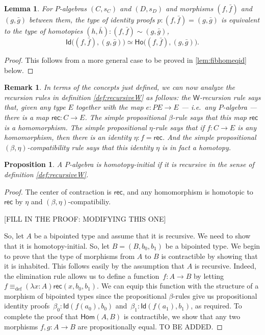 \documentclass[10pt,a4paper,oneside,reqno]{amsart}
\numberwithin{equation}{section}
\theoremstyle{mythm}
\newtheorem{lemma}[theorem]{Lemma}
\newtheorem{proposition}[theorem]{Proposition}
\theoremstyle{mydef}
\theoremstyle{myrmk}
\newtheorem{remark}[theorem]{Remark}
\newcommand{\deq}{\equiv}
\newcommand{\defeq}{\deq_{\mathrm{def}}}
\newcommand{\co}{\colon}
\newcommand{\Id}{\mathsf{Id}}
\newcommand{\W}{\mathsf{W}}
\newcommand{\rec}{\mathsf{rec}}
\newcommand{\Hom}{\mathsf{Hom}}
\newcommand{\Ho}{\mathsf{Ho}}
\begin{document}
\begin{lemma}\label{IdEqHo}
For $P$-algebras $(C,s_C)$ and $(D,s_D)$ and morphisms $(f, \bar{f})$ and $(g, \bar{g})$ between them, the type of identity proofs $p : (f, \bar{f}) = (g, \bar{g})$ is equivalent to the type of homotopies $(h, \bar{h}) : (f, \bar{f}) \sim (g, \bar{g})$,
\[
\Id\big((f, \bar{f}), (g, \bar{g})\big) \simeq \Ho\big((f, \bar{f}), (g, \bar{g})\big).
\]
\end{lemma}

\begin{proof}
This follows from a more general case to be proved in \ref{lem:fibhomeqid} below.
\end{proof}

\begin{remark}\label{rem:explainrules}
In terms of the concepts just defined, we can now analyze the recursion rules in definition \ref{def:recursiveW} as follows: the $\W$-recursion rule says that, given any type $E$ together with the map $e : PE\to E$ --- i.e.\ any $P$-algebra --- there is a map $\rec : C\to E$.  The simple propositional $\beta$-rule says that this map $\rec$ is a homomorphism.  The simple propositional $\eta$-rule says that if $f : C\to E$ is any homomorphism, then there is an identity $\eta : f = \rec$.  And the simple propositional $(\beta, \eta)$-compatibility rule says that this identity $\eta$ is in fact a homotopy.
\end{remark}

\begin{proposition}\label{prop:Wrec2hinit}
A $P$-algebra is homotopy-initial if it is recursive in the sense of definition \ref{def:recursiveW}.
\end{proposition}

\begin{proof}
The center of contraction is $\rec$, and any homomorphism is homotopic to $\rec$ by $\eta$ and $(\beta,\eta)$-compatibiliy.

[FILL IN THE PROOF: MODIFYING THIS ONE]

So, let $A$ be a bipointed type
and assume that it is recursive. We need to show that it is homotopy-initial. So, let $B = (B, b_0, b_1)$ be a bipointed type. We begin to prove
that the type of morphisms from $A$ to $B$ is contractible by showing that it is inhabited. This follows easily by the assumption that $A$
is recursive. Indeed, the elimination rule allows us to define a function~$f \co A \to B$ by letting~$f \defeq (\lambda x \co A) \rec(x, b_0, b_1)$. We can
equip this function with the structure of a morphism of bipointed types since the propositional $\beta$-rules give us propositional identity 
proofs~$\beta_0 \co \Id(f (a_0), b_0)$ and~$\beta_1 \co \Id (f(a_1), b_1)$, as required. To complete the proof that $\Hom(A,B)$ is contractible,
we show that any two morphisms $f, g \co A \to B$ are propositionally equal.  TO BE ADDED.
\end{proof}
\end{document}
